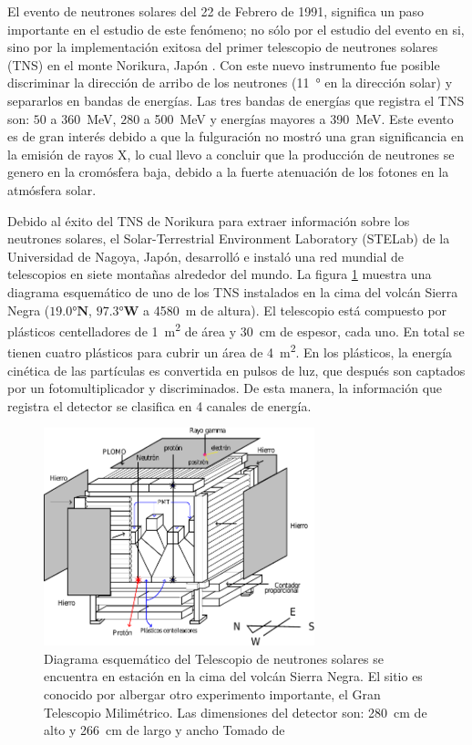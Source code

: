 El evento de neutrones solares del \num{22} de Febrero de \num{1991}, significa un paso importante en el estudio de este fenómeno; no sólo por el estudio del evento en si, sino por la implementación exitosa del primer telescopio de neutrones solares (TNS) en el monte Norikura, Japón \cite{muraki92}. Con este nuevo instrumento fue posible discriminar la dirección de arribo de los neutrones (\SI{11}{\degree} en la dirección solar) y separarlos en bandas de energías. Las tres bandas de energías que registra el TNS son: $50$ a \SI{360}{\mega\electronvolt}, $280$ a \SI{500}{\mega\electronvolt} y energías mayores a \SI{390}{\mega\electronvolt}. Este evento es de gran interés debido a que la fulguración no mostró una gran significancia en la emisión de rayos X, lo cual llevo a concluir que la producción de neutrones se genero en la cromósfera baja, debido a la fuerte atenuación de los fotones en la atmósfera solar.

Debido al éxito del TNS de Norikura para extraer información sobre los neutrones solares, el Solar-Terrestrial Environment Laboratory (STELab) de la Universidad de Nagoya, Japón, desarrolló e instaló una red mundial de telescopios en siete montañas alrededor del mundo. La figura \ref{fig:tns-mexico} muestra una diagrama esquemático de uno de los TNS instalados en la cima del volcán Sierra Negra ($\ang{19.0}\mathbf{N}$, $\ang{97.3}\mathbf{W}$ a \SI{4580}{\metre} de altura). El telescopio está compuesto por plásticos centelladores de \SI{1}{\square\metre} de área y \SI{30}{\centi\metre} de espesor, cada uno. En total se tienen cuatro plásticos para cubrir un área de \SI{4}{\square\metre}. En los plásticos, la energía cinética de las partículas es convertida en pulsos de luz, que después son captados por un fotomultiplicador y discriminados. De esta manera, la información que registra el detector se clasifica en \num{4} canales de energía\cite{valdes04}.

\begin{figure}
        \centering
        \includegraphics[width=0.7\textwidth]{tns-mexico.pdf}
        \caption{Diagrama esquemático del Telescopio de neutrones solares se encuentra en estación en la cima del volcán Sierra Negra. El sitio es conocido por albergar otro experimento importante, el Gran Telescopio Milimétrico. Las dimensiones del detector son: \SI{280}{\centi\metre} de alto y \SI{266}{\centi\metre} de largo y ancho Tomado de \cite{barrantes18}}
        \label{fig:tns-mexico}
\end{figure}

